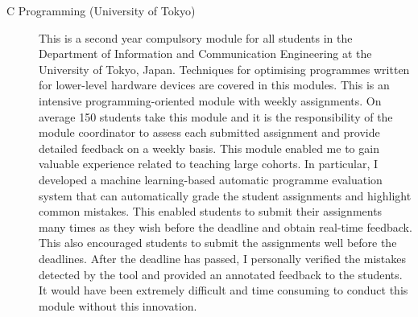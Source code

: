 \documentclass[a4paper,11pt]{article}
\begin{document}
\begin{description}
\item[C Programming (University of Tokyo)]
This is a second year compulsory module for all students in the Department of Information and Communication Engineering at the University of Tokyo, Japan. Techniques for optimising programmes written for lower-level hardware devices are covered in this modules.
This is an intensive programming-oriented module with weekly assignments. On average 150 students take this module and it is the responsibility of the module coordinator to assess each submitted assignment and provide detailed feedback on a weekly basis. 
This module enabled me to gain valuable experience related to teaching large cohorts. 
In particular, I developed a machine learning-based automatic programme evaluation system that can automatically grade the student assignments and highlight common mistakes. This enabled students to submit their assignments many times as they wish before the deadline and obtain real-time feedback. This also encouraged students to submit the assignments well before the deadlines.
After the deadline has passed, I personally verified the mistakes detected by the tool and provided an annotated feedback to the students.
It would have been extremely difficult and time consuming to conduct this module without this innovation.

\end{description}

\end{document}
